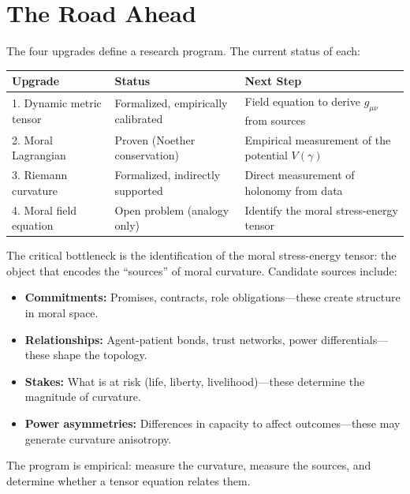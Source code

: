 \documentclass[12pt]{article}
\theoremstyle{definition}
\theoremstyle{remark}
\begin{document}
\section{The Road Ahead}
\label{sec:roadmap}

The four upgrades define a research program. The current status of each:

\begin{center}
\begin{tabular}{llp{6cm}}
\toprule
\textbf{Upgrade} & \textbf{Status} & \textbf{Next Step} \\
\midrule
1. Dynamic metric tensor & Formalized, empirically calibrated & Field equation to derive $g_{\mu\nu}$ from sources \\
2. Moral Lagrangian & Proven (Noether conservation) & Empirical measurement of the potential $V(\gamma)$ \\
3. Riemann curvature & Formalized, indirectly supported & Direct measurement of holonomy from data \\
4. Moral field equation & Open problem (analogy only) & Identify the moral stress-energy tensor \\
\bottomrule
\end{tabular}
\end{center}

The critical bottleneck is the identification of the moral stress-energy tensor: the object that encodes the ``sources'' of moral curvature. Candidate sources include:

\begin{itemize}
    \item \textbf{Commitments:} Promises, contracts, role obligations---these create structure in moral space.
    \item \textbf{Relationships:} Agent-patient bonds, trust networks, power differentials---these shape the topology.
    \item \textbf{Stakes:} What is at risk (life, liberty, livelihood)---these determine the magnitude of curvature.
    \item \textbf{Power asymmetries:} Differences in capacity to affect outcomes---these may generate curvature anisotropy.
\end{itemize}

The program is empirical: measure the curvature, measure the sources, and determine whether a tensor equation relates them.
\end{document}
